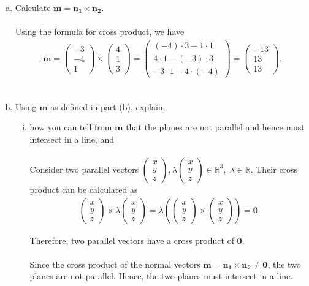 \documentclass{amsart}
\renewcommand{\vec}{\mathbf}
\newcommand{\cvec}[1]{ \begin{pmatrix} #1 \end{pmatrix} }
\begin{document}
\begin{enumerate}[(a)]
\begin{enumerate}[(i)]
				\end{enumerate}

			\item Calculate $\vec{m} = \vec{n_1} \times \vec{n_2}$.
				\\ \\
				Using the formula for cross product, we have
				\begin{align*}
					\vec{m} = \cvec{-3\\-4\\1} \times \cvec{4\\1\\3} = \cvec{(-4)\cdot3 - 1\cdot1 \\ 4\cdot1 - (-3)\cdot3 \\ -3\cdot1 - 4\cdot(-4)} = \cvec{-13\\13\\13}.
				\end{align*}
				\\

			\item Using $\vec{m}$ as defined in part (b), explain,

				\begin{enumerate}[(i)]

					\item how you can tell from $\vec{m}$ that the planes are not parallel and hence must intersect in a line, and
						\\ \\
						Consider two parallel vectors $\cvec{x\\y\\z}, \lambda \cvec{x\\y\\z} \in \mathbb{R}^3, \; \lambda \in \mathbb{R}$. Their cross product can be calculated as
							\begin{align*}
								\cvec{x\\y\\z} \times \lambda \cvec{x\\y\\z} = \lambda \left(\cvec{x\\y\\z} \times \cvec{x\\y\\z}\right) = \vec{0}.
							\end{align*}

						Therefore, two parallel vectors have a cross product of $\vec{0}$.
						\\ \\
						Since the cross product of the normal vectors $\vec{m} = \vec{n_1} \times \vec{n_2} \neq \vec{0}$, the two planes are not parallel. Hence, the two planes must intersect in a line.
						\\


\end{enumerate}
\end{enumerate}
\end{document}
